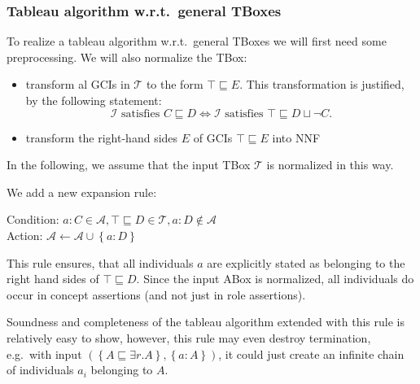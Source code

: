 \subsubsection{Tableau algorithm w.r.t.\ general TBoxes}
To realize a tableau algorithm w.r.t.\ general TBoxes we will first need some preprocessing.
We will also normalize the TBox:
\begin{itemize}
	\item transform al GCIs in $\mathcal{T}$ to the form $\top \sqsubseteq E$.
		This transformation is justified, by the following statement:
		\[
		\mathcal{I} \text{ satisfies } C \sqsubseteq D \iff \mathcal{I} \text{ satisfies } \top \sqsubseteq D \sqcup \neg C
		.\]
	\item transform the right-hand sides $E$ of GCIs $\top \sqsubseteq E$ into NNF
\end{itemize}
In the following, we assume that the input TBox $\mathcal{T}$ is normalized in this way.

We add a new expansion rule:
\begin{mdframed}[frametitle= The $\sqsubseteq$-rule, nobreak = true]
	Condition: $a : C \in \mathcal{A}, \top \sqsubseteq D \in \mathcal{T}, a : D \notin \mathcal{A}$\\
	Action: $\mathcal{A} \leftarrow \mathcal{A} \cup \left\{ a: D \right\}$
\end{mdframed}
\begin{note}
	This rule ensures, that all individuals $a$ are explicitly stated as belonging to the right hand sides of $\top \sqsubseteq D$.
	Since the input ABox is normalized, all individuals do occur in concept assertions (and not just in role assertions).
\end{note}

Soundness and completeness of the tableau algorithm extended with this rule is relatively easy to show,
however, this rule may even destroy termination,
e.g.\ with input $(\left\{ A \sqsubseteq \exists r.A \right\}, \left\{ a :A \right\})$, it could just create an infinite chain of individuals $a_i$ belonging to  $A$.
